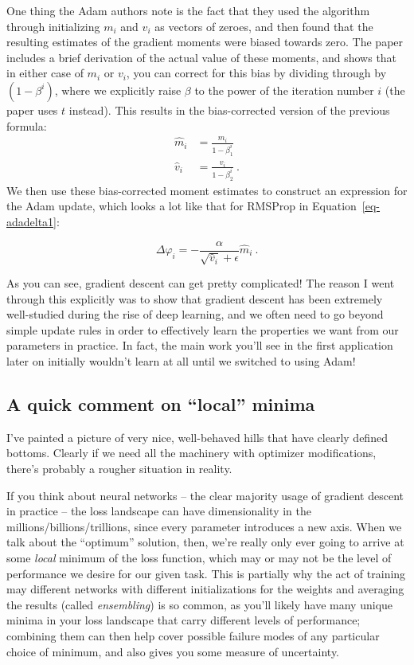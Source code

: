 \documentclass[
  11pt,
  numbers=noendperiod]{book}
\begin{document}
One thing the Adam authors note is the fact that they used the algorithm
through initializing \(m_i\) and \(v_i\) as vectors of zeroes, and then
found that the resulting estimates of the gradient moments were biased
towards zero. The paper includes a brief derivation of the actual value
of these moments, and shows that in either case of \(m_i\) or \(v_i\),
you can correct for this bias by dividing through by \((1-\beta^i)\),
where we explicitly raise \(\beta\) to the power of the iteration number
\(i\) (the paper uses \(t\) instead). This results in the bias-corrected
version of the previous formula: \[
\begin{aligned}
\hat{m}_i &=\frac{m_i}{1-\beta_1^i} \\
\hat{v}_i &=\frac{v_i}{1-\beta_2^i}~.
\end{aligned}
\] We then use these bias-corrected moment estimates to construct an
expression for the Adam update, which looks a lot like that for RMSProp
in Equation~\ref{eq-adadelta1}:

\[
\Delta \varphi_i = - \frac{\alpha}{\sqrt{\hat{v}_i}+ \epsilon} \hat{m}_{i} ~.
\]

As you can see, gradient descent can get pretty complicated! The reason
I went through this explicitly was to show that gradient descent has
been extremely well-studied during the rise of deep learning, and we
often need to go beyond simple update rules in order to effectively
learn the properties we want from our parameters in practice. In fact,
the main work you'll see in the first application later on initially
wouldn't learn at all until we switched to using Adam!

\subsection{A quick comment on ``local'' minima}

I've painted a picture of very nice, well-behaved hills that have clearly defined bottoms. Clearly if we need all the machinery with optimizer modifications, there's probably a rougher situation in reality.

If you think about neural networks -- the clear majority usage of gradient descent in practice -- the loss landscape can have dimensionality in the millions/billions/trillions, since every parameter introduces a new axis. When we talk about the ``optimum'' solution, then, we're really only ever going to arrive at some \textit{local} minimum of the loss function, which may or may not be the level of performance we desire for our given task. This is partially why the act of training may different networks with different initializations for the weights and averaging the results (called \textit{ensembling}) is so common, as you'll likely have many unique minima in your loss landscape that carry different levels of performance; combining them can then help cover possible failure modes of any particular choice of minimum, and also gives you some measure of uncertainty.
\end{document}
